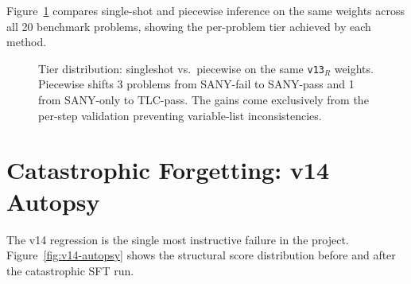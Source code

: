 \documentclass[11pt]{article}
\begin{document}
Figure~\ref{fig:piecewise-comparison} compares single-shot and
piecewise inference on the same weights across all 20 benchmark
problems, showing the per-problem tier achieved by each method.

\begin{figure}[h]
\centering
{}
\caption{Tier distribution: singleshot vs.\ piecewise on the same
\texttt{v13}$_R$ weights.  Piecewise shifts 3 problems from SANY-fail
to SANY-pass and 1 from SANY-only to TLC-pass.  The gains come
exclusively from the per-step validation preventing variable-list
inconsistencies.}
\label{fig:piecewise-comparison}
\end{figure}

\section{Catastrophic Forgetting: v14 Autopsy}
\label{sec:app-v14}

The v14 regression is the single most instructive failure in the
project.  Figure~\ref{fig:v14-autopsy} shows the structural score
distribution before and after the catastrophic SFT run.
\end{document}
